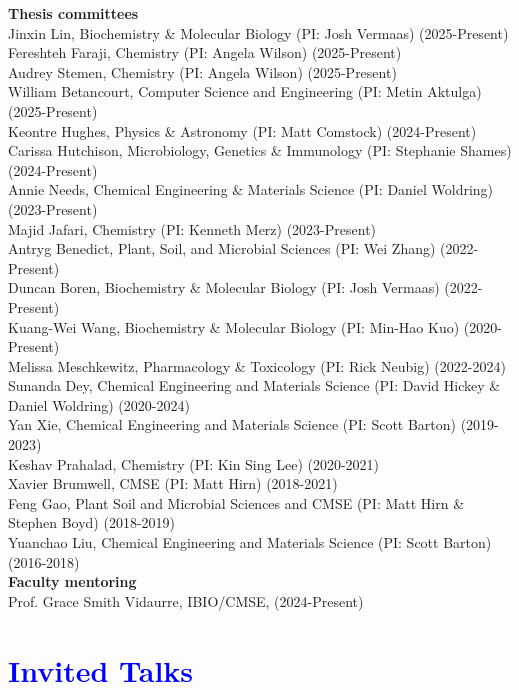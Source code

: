 \documentclass[margin,line]{res}
\begin{document}
\begin{resume}
{\bf Thesis committees}\\
Jinxin Lin, Biochemistry \& Molecular Biology (PI: Josh Vermaas) (2025-Present)\\
Fereshteh Faraji, Chemistry (PI: Angela Wilson) (2025-Present)\\
Audrey Stemen, Chemistry (PI: Angela Wilson) (2025-Present)\\
William Betancourt, Computer Science and Engineering (PI: Metin Aktulga) (2025-Present)\\
Keontre Hughes, Physics \& Astronomy (PI: Matt Comstock) (2024-Present)\\
Carissa Hutchison, Microbiology, Genetics \& Immunology (PI: Stephanie Shames) (2024-Present) \\
Annie Needs, Chemical Engineering \& Materials Science (PI: Daniel Woldring) (2023-Present)\\
Majid Jafari, Chemistry (PI: Kenneth Merz) (2023-Present) \\
Antryg Benedict, Plant, Soil, and Microbial Sciences (PI: Wei Zhang) (2022-Present) \\
Duncan Boren, Biochemistry \& Molecular Biology (PI: Josh Vermaas) (2022-Present) \\
Kuang-Wei Wang, Biochemistry \& Molecular Biology (PI: Min-Hao Kuo) (2020-Present) \\
Melissa Meschkewitz, Pharmacology \& Toxicology (PI: Rick Neubig) (2022-2024) \\
Sunanda Dey, Chemical Engineering and Materials Science (PI: David Hickey \& Daniel Woldring) (2020-2024) \\
Yan Xie, Chemical Engineering and Materials Science (PI: Scott Barton) (2019-2023) \\
Keshav Prahalad, Chemistry (PI: Kin Sing Lee) (2020-2021) \\
Xavier Brumwell, CMSE (PI: Matt Hirn) (2018-2021) \\
Feng Gao, Plant Soil and Microbial Sciences and CMSE (PI: Matt Hirn \& Stephen Boyd) (2018-2019) \\
Yuanchao Liu, Chemical Engineering and Materials Science (PI: Scott Barton) (2016-2018) \\

{\bf Faculty mentoring}\\
Prof. Grace Smith Vidaurre, IBIO/CMSE, (2024-Present)\\

\section{\sc \textcolor{blue}{ Invited Talks }}


\end{resume}
\end{document}
